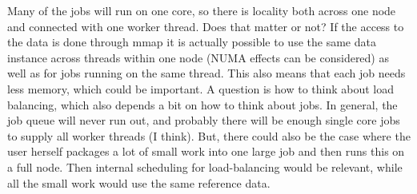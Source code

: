 \documentclass[a4paper]{article}
\begin{document}
  
  
  
Many of the jobs will run on one core, so there is locality both across one node and connected with one worker thread. Does that matter or not?
If the access to the data is done through mmap it is actually possible to use the same data instance across threads within one node (NUMA effects can be considered) as well as for jobs running on the same thread. This also means that each job needs less memory, which could be important.
A question is how to think about load balancing, which also depends a bit on how to think about jobs. In general, the job queue will never run out, and probably there will be enough single core jobs to supply all worker threads (I think). But, there could also be the case where the user herself packages a lot of small work into one large job and then runs this on a full node. Then internal scheduling for load-balancing would be relevant, while all the small work would use the same reference data.
\end{document}
